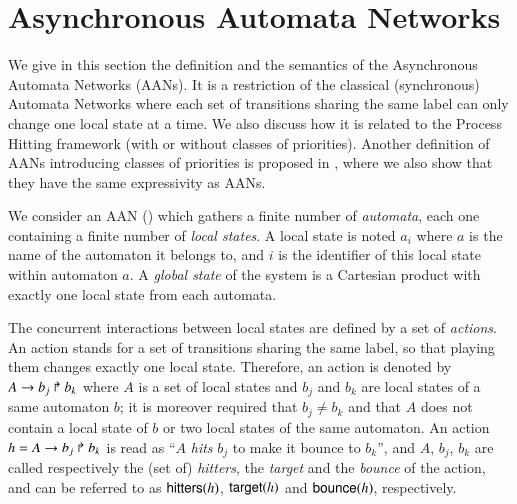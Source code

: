 \section{Asynchronous Automata Networks}
\label{sec:ph}

We give in this section the definition and the semantics of the Asynchronous Automata Networks (AANs).
It is a restriction of the classical (synchronous) Automata Networks
where each set of transitions sharing the same label
can only change one local state at a time.
We also discuss how it is related to the Process Hitting framework
(with or without classes of priorities).
Another definition of AANs introducing classes of priorities
is proposed in ,
where we also show that they have the same expressivity as AANs.

\medskip



We consider an AAN ()
which gathers a finite number of \emph{automata},
each one containing a finite number of \emph{local states}.
A local state is noted $a_i$ where $a$ is the name of the automaton it belongs to,
and $i$ is the identifier of this local state within automaton $a$.
A \emph{global state} of the system is a Cartesian product
with exactly one local state from each automata.

The concurrent interactions between local states are defined by a set of \emph{actions}.
An action stands for a set of transitions sharing the same label,
so that playing them changes exactly one local state.
Therefore, an action is denoted by $A\rightarrow b_j\Rsh b_k$
where $A$ is a set of local states
and $b_j$ and $b_k$ are local states of a same automaton $b$;
it is moreover required that $b_j \neq b_k$ and that
$A$ does not contain a local state of $b$ or two local states of the same automaton.
An action $h=A\rightarrow b_j\Rsh b_k$ is read as
``$A$ \emph{hits} $b_j$ to make it bounce to $b_k$'',
and $A$, $b_j$, $b_k$ are called respectively the (set of)
\emph{hitters}, the \emph{target} and the \emph{bounce} of the action,
and can be referred to as $\mathsf{hitters}(h)$, $\mathsf{target}(h)$ and $\mathsf{bounce}(h)$, respectively.


